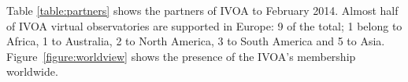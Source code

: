 Table \ref{table:partners} shows the partners of IVOA to
February 2014. 
Almost half of IVOA virtual observatories are supported in Europe:
9 of
the total; 1 belong to Africa, 1 to Australia, 2 to North America, 3 to South
America and 5 to Asia. Figure~\ref{figure:worldview} shows the presence of the 
IVOA's membership worldwide.




%


